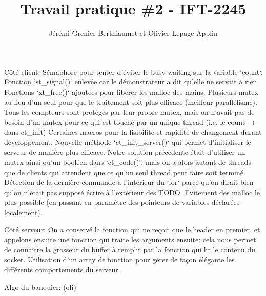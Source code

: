 \documentclass[11pt]{article}
\title{Travail pratique \#2 - IFT-2245}
\author{Jérémi Grenier-Berthiaumet et Olivier Lepage-Applin}
\begin{document}
\maketitle


Côté client:
Sémaphore pour tenter d'éviter le busy waiting sur la variable `count`.
Fonction `st\_signal()` enlevée car le démonstrateur a dit qu'elle ne servait à rien.
Fonctions `xt\_free()` ajoutées pour libérer les malloc des mains.
Plusieurs mutex au lieu d'un seul pour que le traitement soit plus efficace (meilleur parallélisme). Tous les compteurs sont protégés par leur propre mutex, mais on n'avait pas de besoin d'un mutex pour ce qui est touché par un unique thread (i.e. le count++ dans ct\_init)
Certaines macros pour la lisibilité et rapidité de changement durant développement.
Nouvelle méthode `ct\_init\_server()` qui permet d'initialiser le serveur de manière plus efficace. Notre solution précédente était d'utiliser un mutex ainsi qu'un booléen dans `ct\_code()`, mais on a alors autant de threads que de clients qui attendent que ce qu'un seul thread peut faire soit terminé.
Détection de la dernière commande à l'intérieur du `for` parce qu'on dirait bien qu'on n'était pas supposé écrire à l'extérieur des TODO.
Évitement des malloc le plus possible (en passant en paramètre des pointeurs de variables déclarées localement).



Côté serveur:
On a conservé la fonction qui ne reçoit que le header en premier, et appelons ensuite une fonction qui traite les arguments ensuite: cela nous permet de connaître la grosseur du buffer à remplir par la fonction qui lit le contenu du socket.
Utilisation d'un array de fonction pour gérer de façon élégante les différents comportements du serveur.



Algo du banquier:
(oli)
\end{document}
